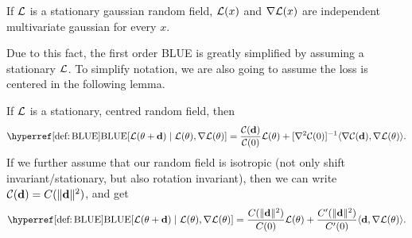 \begin{corollary}
	If \(\mathcal{L}\) is a stationary gaussian random field, \(\mathcal{L}(x)\) and
	\(\nabla\mathcal{L}(x)\) are independent multivariate gaussian for every \(x\).
\end{corollary}

Due to this fact, the first order BLUE is greatly simplified by assuming a
stationary \(\mathcal{L}\). To simplify notation, we are also going to assume
the loss is centered in the following lemma.

\begin{lemma}
	If \(\mathcal{L}\) is a stationary, centred random field, then
	\begin{equation*}
		\BLUE[\Loss(\param + \step)\mid \Loss(\param), \nabla\Loss(\param)]
		= \frac{\C(\step)}{\C(0)} \Loss(\param)
		+ [\nabla^2\C(0)]^{-1} \langle \nabla \C(\step), \nabla\Loss(\param)\rangle.
	\end{equation*}
	If we further assume that our random field is isotropic (not only shift
	invariant/stationary, but also rotation invariant), then we can
	write \(\mathcal{C}(\mathbf{d})=C(\|\mathbf{d}\|^2)\), and get
	\begin{equation*}
		\BLUE[\Loss(\param + \step)\mid \Loss(\param), \nabla\Loss(\param)]
		= \frac{\iC(\|\step\|^2)}{\iC(0)} \Loss(\param)
		+ \frac{\iC'(\|\step\|^2)}{\iC'(0)} \langle \step, \nabla\Loss(\param)\rangle.
	\end{equation*}
\end{lemma}
